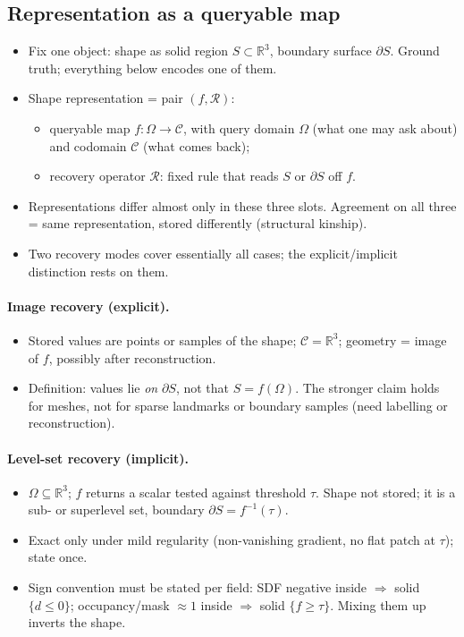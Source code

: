 \subsection{Representation as a queryable map}
\label{sec:shape-frame}

\begin{itemize}
    \item Fix one object: shape as solid region $S \subset \mathbb{R}^3$, boundary surface $\partial S$. Ground truth; everything below encodes one of them.
    \item Shape representation = pair $(f, \mathcal{R})$:
    \begin{itemize}
        \item queryable map $f : \Omega \to \mathcal{C}$, with query domain $\Omega$ (what one may ask about) and codomain $\mathcal{C}$ (what comes back);
        \item recovery operator $\mathcal{R}$: fixed rule that reads $S$ or $\partial S$ off $f$.
    \end{itemize}
    \item Representations differ almost only in these three slots. Agreement on all three = same representation, stored differently (structural kinship).
    \item Two recovery modes cover essentially all cases; the explicit/implicit distinction rests on them.
\end{itemize}

\paragraph{Image recovery (explicit).}
\begin{itemize}
    \item Stored values are points or samples of the shape; $\mathcal{C} = \mathbb{R}^3$; geometry = image of $f$, possibly after reconstruction.
    \item Definition: values lie \emph{on} $\partial S$, not that $S = f(\Omega)$. The stronger claim holds for meshes, not for sparse landmarks or boundary samples (need labelling or reconstruction).
\end{itemize}

\paragraph{Level-set recovery (implicit).}
\begin{itemize}
    \item $\Omega \subseteq \mathbb{R}^3$; $f$ returns a scalar tested against threshold $\tau$. Shape not stored; it is a sub- or superlevel set, boundary $\partial S = f^{-1}(\tau)$.
    \item Exact only under mild regularity (non-vanishing gradient, no flat patch at $\tau$); state once.
    \item Sign convention must be stated per field: SDF negative inside $\Rightarrow$ solid $\{d \le 0\}$; occupancy/mask $\approx 1$ inside $\Rightarrow$ solid $\{f \ge \tau\}$. Mixing them up inverts the shape.
\end{itemize}

